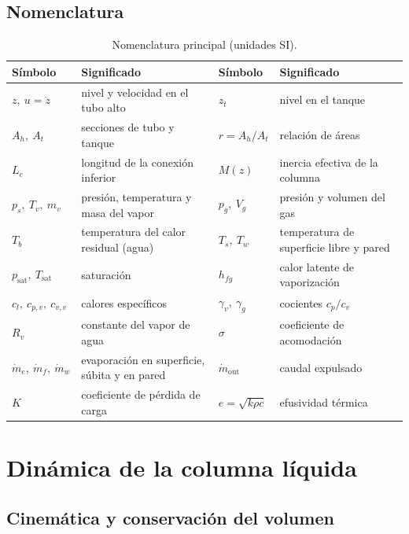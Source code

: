 \documentclass[11pt,a4paper]{article}
\newcommand{\psat}{p_{\mathrm{sat}}}
\newcommand{\Tsat}{T_{\mathrm{sat}}}
\newcommand{\hfg}{h_{fg}}
\newcommand{\mdot}{\dot m}
\begin{document}
\subsection{Nomenclatura}

\begin{table}[ht]
\centering\small
\begin{tabularx}{\linewidth}{@{}l X l X@{}}
\toprule
Símbolo & Significado & Símbolo & Significado \\
\midrule
$z,\ u=\dot z$ & nivel y velocidad en el tubo alto & $z_t$ & nivel en el tanque \\
$A_h,\ A_t$ & secciones de tubo y tanque & $r=A_h/A_t$ & relación de áreas \\
$L_c$ & longitud de la conexión inferior & $M(z)$ & inercia efectiva de la columna \\
$p_s,\ T_v,\ m_v$ & presión, temperatura y masa del vapor & $p_g,\ V_g$ & presión y volumen del gas \\
$T_b$ & temperatura del calor residual (agua) & $T_s,\ T_w$ & temperatura de superficie libre y pared \\
$\psat,\ \Tsat$ & saturación & $\hfg$ & calor latente de vaporización \\
$c_l,\ c_{p,v},\ c_{v,v}$ & calores específicos & $\gamma_v,\ \gamma_g$ & cocientes $c_p/c_v$ \\
$R_v$ & constante del vapor de agua & $\sigma$ & coeficiente de acomodación \\
$\mdot_e,\ \mdot_f,\ \mdot_w$ & evaporación en superficie, súbita y en pared & $\mdot_{\mathrm{out}}$ & caudal expulsado \\
$K$ & coeficiente de pérdida de carga & $e=\sqrt{k\rho c}$ & efusividad térmica \\
\bottomrule
\end{tabularx}
\caption{Nomenclatura principal (unidades SI).}
\end{table}

\section{Dinámica de la columna líquida}

\subsection{Cinemática y conservación del volumen}
\end{document}

